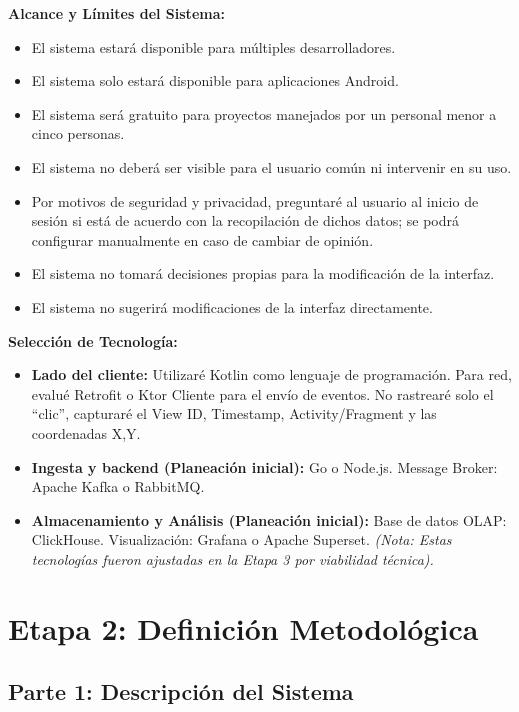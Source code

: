 \documentclass[final,3p,times]{elsarticle}
\begin{document}
\vspace{0.5cm}
\noindent\textbf{Alcance y Límites del Sistema:}
\begin{itemize}
    \item El sistema estará disponible para múltiples desarrolladores.
    \item El sistema solo estará disponible para aplicaciones Android.
    \item El sistema será gratuito para proyectos manejados por un personal menor a cinco personas.
    \item El sistema no deberá ser visible para el usuario común ni intervenir en su uso.
    \item Por motivos de seguridad y privacidad, preguntaré al usuario al inicio de sesión si está de acuerdo con la recopilación de dichos datos; se podrá configurar manualmente en caso de cambiar de opinión.
    \item El sistema no tomará decisiones propias para la modificación de la interfaz.
    \item El sistema no sugerirá modificaciones de la interfaz directamente.
\end{itemize}

\vspace{0.5cm}
\noindent\textbf{Selección de Tecnología:}
\begin{itemize}
    \item \textbf{Lado del cliente:} Utilizaré Kotlin como lenguaje de programación. Para red, evalué Retrofit o Ktor Cliente para el envío de eventos. No rastrearé solo el ``clic'', capturaré el View ID, Timestamp, Activity/Fragment y las coordenadas X,Y.
    \item \textbf{Ingesta y backend (Planeación inicial):} Go o Node.js. Message Broker: Apache Kafka o RabbitMQ.
    \item \textbf{Almacenamiento y Análisis (Planeación inicial):} Base de datos OLAP: ClickHouse. Visualización: Grafana o Apache Superset. \textit{(Nota: Estas tecnologías fueron ajustadas en la Etapa 3 por viabilidad técnica).}
\end{itemize}

\section{Etapa 2: Definición Metodológica}

\subsection{Parte 1: Descripción del Sistema}
\end{document}
